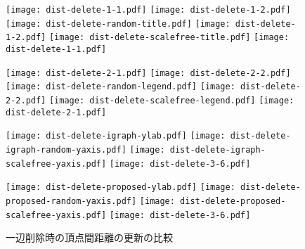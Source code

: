 \begin{figure}
  \centering
  \texttt{[image: dist-delete-1-1.pdf]}
  \texttt{[image: dist-delete-1-2.pdf]}
  \hspace{-5mm}
  \texttt{[image: dist-delete-random-title.pdf]}
  \hspace{5mm}
  \texttt{[image: dist-delete-1-2.pdf]}
  \hspace{-5mm}
  \texttt{[image: dist-delete-scalefree-title.pdf]}
  \texttt{[image: dist-delete-1-1.pdf]}
  \vspace{-3mm}

  \texttt{[image: dist-delete-2-1.pdf]}
  \texttt{[image: dist-delete-2-2.pdf]}
  \hspace{-5mm}
  \texttt{[image: dist-delete-random-legend.pdf]}
  \hspace{5mm}
  \texttt{[image: dist-delete-2-2.pdf]}
  \hspace{-5mm}
  \texttt{[image: dist-delete-scalefree-legend.pdf]}
  \texttt{[image: dist-delete-2-1.pdf]}
  \vspace{-3mm}

  \texttt{[image: dist-delete-igraph-ylab.pdf]}
  \texttt{[image: dist-delete-igraph-random-yaxis.pdf]}
  \hspace{-5mm}
  \hspace{5mm}
  \texttt{[image: dist-delete-igraph-scalefree-yaxis.pdf]}
  \hspace{-5mm}
  \texttt{[image: dist-delete-3-6.pdf]} \\
  \vspace{3mm}

  \texttt{[image: dist-delete-proposed-ylab.pdf]}
  \texttt{[image: dist-delete-proposed-random-yaxis.pdf]}
  \hspace{-5mm}
  \hspace{5mm}
  \texttt{[image: dist-delete-proposed-scalefree-yaxis.pdf]}
  \hspace{-5mm}
  \texttt{[image: dist-delete-3-6.pdf]}

  \caption{一辺削除時の頂点間距離の更新の比較}
  \label{fig:dist-delete}
\end{figure}

